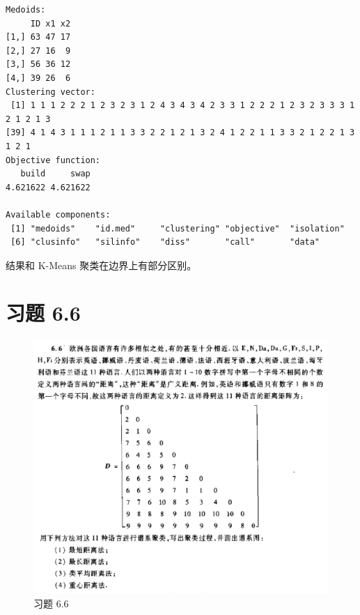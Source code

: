 \documentclass[11pt]{article}
\begin{document}
    
    \begin{Verbatim}[commandchars=\\\{\}]
Medoids:
     ID x1 x2
[1,] 63 47 17
[2,] 27 16  9
[3,] 56 36 12
[4,] 39 26  6
Clustering vector:
 [1] 1 1 1 2 2 2 1 2 3 2 3 1 2 4 3 4 3 4 2 3 3 1 2 2 2 1 2 3 2 3 3 3 1 2 1 2 1 3
[39] 4 1 4 3 1 1 1 2 1 1 3 3 2 2 1 2 1 3 2 4 1 2 2 1 1 3 3 2 1 2 2 1 3 1 2 1
Objective function:
   build     swap 
4.621622 4.621622 

Available components:
 [1] "medoids"    "id.med"     "clustering" "objective"  "isolation" 
 [6] "clusinfo"   "silinfo"    "diss"       "call"       "data"      
    \end{Verbatim}

    
    \begin{center}
    \end{center}
    
    结果和 K-Means 聚类在边界上有部分区别。




    
    \hypertarget{ux4e60ux9898-6.6}{%
\section{习题 6.6}\label{ux4e60ux9898-6.6}}

\begin{figure}
\centering
\includegraphics{ex_6_6_files/008i3skNly1grd8hp3zuaj30yx0u0dn0.jpg}
\caption{习题 6.6}
\end{figure}
\end{document}
